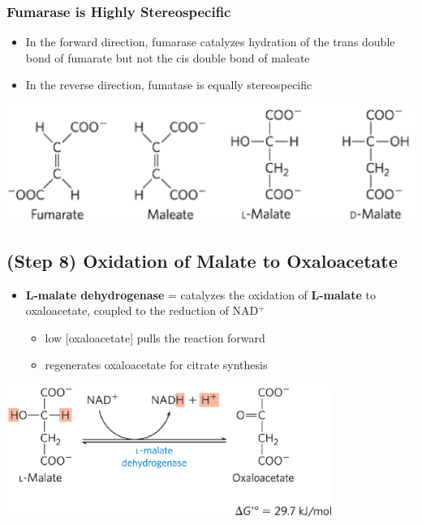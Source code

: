 \documentclass[10pt]{article}
\begin{document}
\subsubsection*{Fumarase is Highly Stereospecific}
\begin{itemize}
	\item In the forward direction, fumarase catalyzes hydration of the trans double bond of fumarate but not the cis double bond of maleate
	\item In the reverse direction, fumatase is equally stereospecific
\end{itemize}
\begin{center} 
	\includegraphics*[width=\textwidth]{L4_19.png} 
\end{center}

\subsection*{(Step 8) Oxidation of Malate to Oxaloacetate}
\begin{itemize}
	\item \textbf{L-malate dehydrogenase} = catalyzes the oxidation of \textbf{L-malate} to oxaloacetate, coupled to the reduction of NAD$^+$
	\begin{itemize}
        \item low [oxaloacetate] pulls the reaction forward
        \item regenerates oxaloacetate for citrate synthesis
    \end{itemize}
\end{itemize}
\begin{center} 
    \includegraphics*[width=0.8\textwidth]{L4_20.png} 
\end{center}
\end{document}

